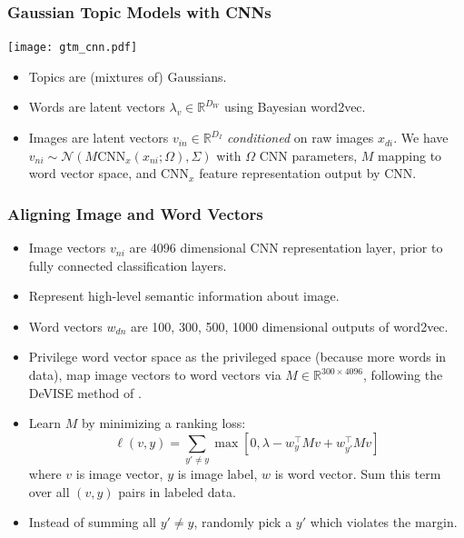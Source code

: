 \documentclass{beamer}
\begin{document}
\begin{frame}
  \frametitle{Gaussian Topic Models with CNNs}
  \begin{center}
    \texttt{[image: gtm\_cnn.pdf]}
  \end{center}
  {\small
  \begin{itemize}
  \item Topics are (mixtures of) Gaussians.
  \item Words are latent vectors $\lambda_v \in \mathbb{R}^{D_W}$ using Bayesian word2vec.
  \item Images are latent vectors $v_{in} \in \mathbb{R}^{D_I}$ \emph{conditioned} on raw images $x_{di}$. We have $v_{ni} \sim \mathcal{N}(M \text{CNN}_x(x_{ni} ; \Omega), \Sigma)$ with $\Omega$ CNN parameters, $M$ mapping to word vector space, and $\text{CNN}_x$ feature representation output by CNN.
  \end{itemize}
  \par}
\end{frame}

\begin{frame}
  \frametitle{Aligning Image and Word Vectors}
  \begin{itemize}
    \item Image vectors $v_{ni}$ are 4096 dimensional CNN representation layer, prior to fully connected classification layers.
    \item Represent high-level semantic information about image.
    \item Word vectors $w_{dn}$ are {100, 300, 500, 1000} dimensional outputs of word2vec.
    \item Privilege word vector space as the privileged space (because more words in data), map image vectors to word vectors via $M \in \mathbb{R}^{300 \times 4096}$, following the DeVISE method of \citet{Frome13}.
    \item Learn $M$ by minimizing a ranking loss: $$\ell(v, y) = \sum_{y' \neq y} \max \left[0, \lambda - w_{y}^\top M v + w_{y'} ^\top M v \right]$$ where $v$ is image vector, $y$ is image label, $w$ is word vector. Sum this term over all $(v, y)$ pairs in labeled data.
    \item Instead of summing all $y' \neq y$, randomly pick a $y'$ which violates the margin.
  \end{itemize}
\end{frame}
\end{document}
